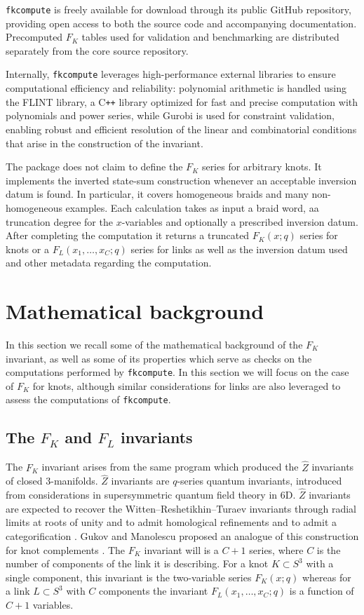 \documentclass[twocolumn]{article}
\begin{document}
\texttt{fkcompute} is freely available for download through its public GitHub repository, providing open access to both the source code and accompanying documentation. 
Precomputed $F_K$ tables used for validation and benchmarking are distributed separately from the core source repository.

Internally, \texttt{fkcompute} leverages high-performance external libraries to ensure computational efficiency and reliability: polynomial arithmetic is handled using the FLINT library, a C\texttt{++} library optimized for fast and precise computation with polynomials and power series, while Gurobi is used for constraint validation, enabling robust and efficient resolution of the linear and combinatorial conditions that arise in the construction of the invariant.

The package does not claim to define the $F_K$ series for arbitrary knots.
It implements the inverted state-sum construction whenever an acceptable inversion datum is found. 
In particular, it covers homogeneous braids and many non-homogeneous examples.
Each calculation takes as input a braid word, aa truncation degree for the $x$-variables and optionally a prescribed inversion datum.
After completing the computation it returns a truncated $F_K(x;q)$ series for knots or a $F_L(x_1,\dots,x_C;q)$ series for links as well as the inversion datum used and other metadata regarding the computation.

\section{Mathematical background}

In this section we recall some of the mathematical background of the $F_K$ invariant, as well as some of its properties which serve as checks on the computations performed by \texttt{fkcompute}.
In this section we will focus on the case of $F_K$ for knots, although similar considerations for links are also leveraged to assess the computations of \texttt{fkcompute}.

\subsection{The $F_K$ and $F_L$ invariants}
The $F_K$ invariant arises from the same program which produced the $\widehat{Z}$ invariants of closed 3-manifolds.
$\widehat{Z}$ invariants are $q$-series quantum invariants, introduced from considerations in supersymmetric quantum field theory in 6D.
$\widehat{Z}$ invariants are expected to recover the Witten--Reshetikhin--Turaev invariants through radial limits at roots of unity and to admit homological refinements and to admit a categorification
\cite{GPV,GPPV}.
Gukov and Manolescu proposed an analogue of this construction for knot complements \cite{GM}.  
The $F_K$ invariant will is a $C+1$ series, where $C$ is the number of components of the link it is describing.
For a knot $K\subset S^3$ with a single component, this invariant is the two-variable series $F_K(x;q)$ whereas for a link $L\subset S^3$ with $C$ components the invariant $F_L(x_1,\dots,x_C;q)$ is a function of $C+1$ variables.
\end{document}
